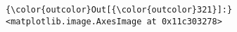 \documentclass[11pt]{article}
\begin{document}
\begin{Verbatim}[commandchars=\\\{\}]
{\color{outcolor}Out[{\color{outcolor}321}]:} <matplotlib.image.AxesImage at 0x11c303278>
\end{Verbatim}
            
    \begin{center}
    \end{center}
    { \hspace*{\fill} \\}
    

    
    
    
    
\end{document}
